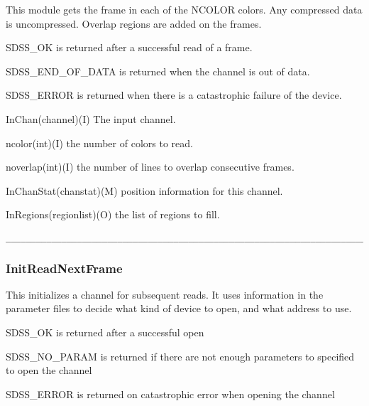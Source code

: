 \begin{descrip}
This module gets the frame in each of the NCOLOR colors.  Any compressed
data is uncompressed.  Overlap regions are added on the frames.
\end{descrip}

\begin{returnval}
\item{SDSS\_OK} is returned after a successful read of a frame.
\item{SDSS\_END\_OF\_DATA} is returned when the channel is out of data.
\item{SDSS\_ERROR} is returned when there is a catastrophic failure of the 
device.
\end{returnval}

\begin{arguments}
\item{InChan}(channel)(I) The input channel.
\item{ncolor}(int)(I) the number of colors to read.
\item{noverlap}(int)(I) the number of lines to overlap consecutive frames.
\item{InChanStat}(chanstat)(M) position information for this channel.
\item{InRegions}(regionlist)(O) the list of regions to fill.
\end{arguments}

\begin{verbatim}
__________________________________________________________________________
\end{verbatim}

\subsubsection{InitReadNextFrame}

\begin{descrip}
This initializes a channel for subsequent reads.  It uses information in 
the parameter files to decide what kind of device to open, and what 
address to use.
\end{descrip}

\begin{returnval}
\item{SDSS\_OK} is returned after a successful open
\item{SDSS\_NO\_PARAM} is returned if there are not enough parameters to
	specified to open the channel
\item{SDSS\_ERROR} is returned on catastrophic error when opening the channel
\end{returnval}

